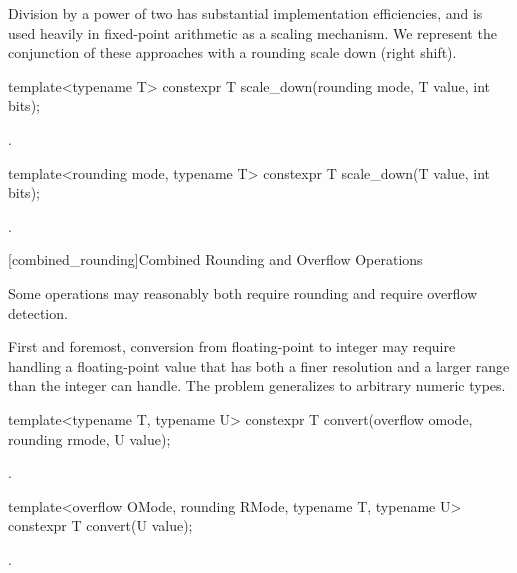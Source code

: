 \begin{addedblock}
Division by a power of two has substantial implementation efficiencies, and is used heavily in fixed-point arithmetic as a scaling mechanism. We represent the conjunction of these approaches with a rounding scale down (right shift).

\begin{itemdecl}
template<typename T>
constexpr T scale_down(rounding mode, T value, int bits);
\end{itemdecl}

\begin{itemdescr}
\returns {}.
\end{itemdescr}

\begin{itemdecl}
template<rounding mode, typename T>
constexpr T scale_down(T value, int bits);
\end{itemdecl}

\begin{itemdescr}
\returns {}.
\end{itemdescr}

[combined_rounding]{Combined Rounding and Overflow Operations}

Some operations may reasonably both require rounding and require overflow detection.

First and foremost, conversion from floating-point to integer may require handling a floating-point value that has both a finer resolution and a larger range than the integer can handle. The problem generalizes to arbitrary numeric types.

\begin{itemdecl}
template<typename T, typename U>
constexpr T convert(overflow omode, rounding rmode, U value);
\end{itemdecl}

\begin{itemdescr}
\returns {}.
\end{itemdescr}

\begin{itemdecl}
template<overflow OMode, rounding RMode, typename T, typename U>
constexpr T convert(U value);
\end{itemdecl}

\begin{itemdescr}
\returns {}.
\end{itemdescr}


\end{addedblock}
